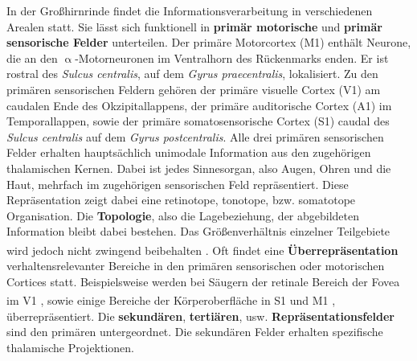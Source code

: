 In der Großhirnrinde findet die Informationsverarbeitung in verschiedenen Arealen statt. Sie lässt sich funktionell in \textbf{primär motorische} und \textbf{primär sensorische Felder} unterteilen. Der primäre Motorcortex (M1) enthält Neurone, die an den $\upalpha$-Motorneuronen im Ventralhorn des Rückenmarks enden. Er ist rostral des \textit{Sulcus centralis}, auf dem \textit{Gyrus praecentralis}, lokalisiert. Zu den primären sensorischen Feldern gehören der primäre visuelle Cortex (V1) am caudalen Ende des Okzipitallappens, der primäre auditorische Cortex (A1) im Temporallappen, sowie der primäre somatosensorische Cortex (S1) caudal des \textit{Sulcus centralis} auf dem \textit{Gyrus postcentralis}. Alle drei primären sensorischen Felder erhalten hauptsächlich unimodale Information aus den zugehörigen thalamischen Kernen. Dabei ist jedes Sinnesorgan, also Augen, Ohren und die Haut, mehrfach im zugehörigen sensorischen Feld repräsentiert. Diese Repräsentation zeigt dabei eine retinotope, tonotope, bzw. somatotope Organisation. Die \textbf{Topologie}, also die Lagebeziehung, der abgebildeten Information bleibt dabei bestehen. Das Größenverhältnis einzelner Teilgebiete wird jedoch nicht zwingend beibehalten \textsuperscript{\cite[Kap.~14]{penzlin2005tierphys}}. Oft findet eine \textbf{Überrepräsentation} verhaltensrelevanter Bereiche in den primären sensorischen oder motorischen Cortices statt. Beispielsweise werden bei Säugern der retinale Bereich der Fovea im V1 \textsuperscript{\cite{overrepresentation_fovea}}, sowie einige Bereiche der Körperoberfläche in S1 und M1 \textsuperscript{\cite[Kap.~14]{penzlin2005tierphys}}, überrepräsentiert. Die \textbf{sekundären}, \textbf{tertiären}, usw. \textbf{Repräsentationsfelder} sind den primären untergeordnet. Die sekundären Felder erhalten spezifische thalamische Projektionen.\\

